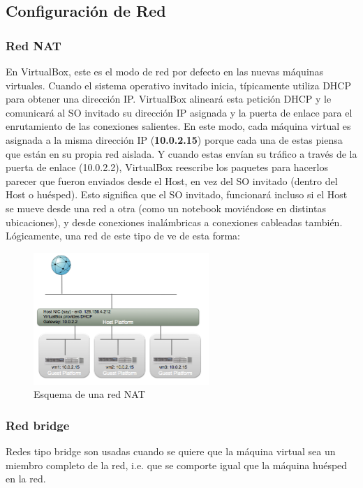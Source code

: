 \documentclass[11pt]{article}
\begin{document}
\subsection{Configuración de Red}
\subsubsection{Red NAT}
En VirtualBox, este es el modo de red por defecto en las nuevas máquinas virtuales. Cuando el sistema operativo invitado inicia, típicamente utiliza DHCP para obtener una dirección IP. VirtualBox alineará esta petición DHCP y le comunicará al SO invitado su dirección IP asignada y la puerta de enlace para el enrutamiento de las conexiones salientes. En este modo, cada máquina virtual es asignada a la misma dirección IP (\textbf{10.0.2.15}) porque cada una de estas piensa que están en su propia red aislada. Y cuando estas envían su tráfico a través de la puerta de enlace (10.0.2.2), VirtualBox reescribe los paquetes para hacerlos parecer que fueron enviados desde el Host, en vez del SO invitado (dentro del Host o huésped).
Esto significa que el SO invitado, funcionará incluso si el Host se mueve desde una red a otra (como un notebook moviéndose en distintas ubicaciones), y desde conexiones inalámbricas a conexiones cableadas también. Lógicamente, una red de este tipo de ve de esta forma:

	\begin{figure}[ht]
	\center
	\includegraphics[width=0.5\linewidth, height=5cm]{screenshots/nat-network.png} 
	\caption{Esquema de una red NAT}
	\end{figure}

\clearpage

\subsubsection{Red bridge}
	Redes tipo bridge son usadas cuando se quiere que la máquina virtual sea un miembro completo de la red, i.e. que se comporte igual que la máquina huésped en la red.
\end{document}
